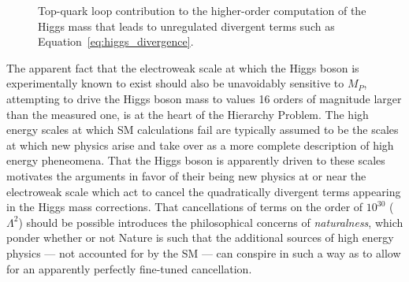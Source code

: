 \begin{description}
\begin{figure}[!htb]
\begin{minipage}{0.8\textwidth}
\begin{center}
{                    Top-quark loop contribution to the higher-order computation of the Higgs mass that
                    leads to unregulated divergent terms such as Equation~\ref{eq:higgs_divergence}.
                }
                \label{fig:higgs_mass_correction}
            \end{center}
        \end{minipage}
        \end{figure}
        The apparent fact that the electroweak scale at which the Higgs boson is experimentally known to exist
        should also be unavoidably sensitive to $M_P$, attempting to drive the Higgs boson mass to values 16 orders
        of magnitude larger than the measured one,
        is at the heart of the Hierarchy Problem.
        The high energy scales at which SM calculations fail are typically assumed to be the scales
        at which new physics arise and take over as a more complete description of high energy pheneomena.
        That the Higgs boson is apparently driven to these scales motivates the arguments in favor
        of their being new physics at or near the electroweak scale which act to cancel the quadratically
        divergent terms appearing in the Higgs mass corrections.
        That cancellations of terms on the order of $10^{30}$ ($\Lambda^2$) should be possible introduces the
        philosophical concerns of \textit{naturalness}, which ponder whether or not Nature is such
        that the additional sources of high energy physics --- not accounted for by the SM --- can conspire in such a way as to
        allow for an apparently perfectly fine-tuned cancellation.
\end{description}

